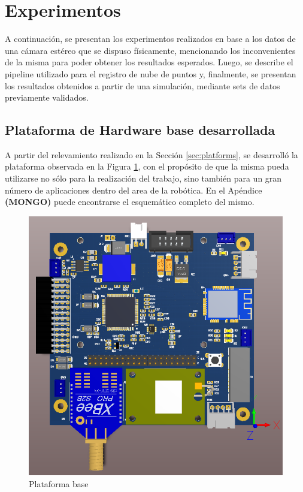 \section{Experimentos}
\ifimagenes
A continuación, se presentan los experimentos realizados en base a los datos de una cámara estéreo que se dispuso físicamente, mencionando los inconvenientes de la misma para poder obtener los resultados esperados. Luego, se describe el pipeline utilizado para el registro de nube de puntos y, finalmente, se presentan los resultados obtenidos a partir de una simulación, mediante sets de datos previamente validados.
\else
\subsection{Plataforma de Hardware base desarrollada}
A partir del relevamiento realizado en la Sección \ref{sec:platforms}, se desarrolló la plataforma observada en la Figura \ref{fig:baseboardv2_1}, con el propósito de que la misma pueda utilizarse no sólo para la realización del trabajo, sino también para un gran número de aplicaciones dentro del area de la robótica. En el Apéndice \textbf{(MONGO)} puede encontrarse el esquemático completo del mismo.

\begin{figure}[!ht]
    \centering
    \includegraphics[width=\textwidth]{Img/BaseBoardV2_1.png}
    \caption{Plataforma base}
    \label{fig:baseboardv2_1}
\end{figure}


